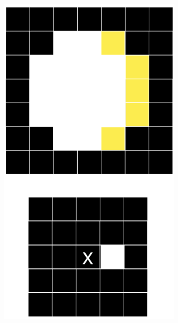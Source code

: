 \documentclass[tikz,14pt,fleqn]{article}
\begin{document}
\begin{figure}[h!]
\begin{subfigure}[b]{0.195\linewidth}
    \end{subfigure}
    \begin{subfigure}[b]{0.195\linewidth}
        \centering
        \includegraphics[width=\linewidth]{fig/4.er2.png}
    \end{subfigure}
    \begin{subfigure}[b]{0.195\linewidth}
        \centering

\end{subfigure}
\end{figure}
\end{document}
